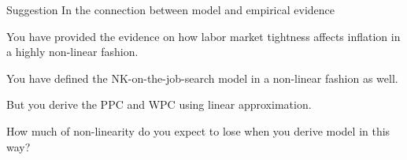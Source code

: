 \documentclass[11pt,aspectratio=169,usenames,dvipsnames]{beamer}
\let\tempone\itemize
\let\temptwo\enditemize
\renewenvironment{itemize}{\tempone\addtolength{\itemsep}{\fill}}{\temptwo}
\begin{document}
\begin{frame}{Suggestion}
\label{slide:Suggestion}
    In the connection between model and empirical evidence
    \begin{itemize}
        \item You have provided the evidence on how labor market tightness affects inflation in a highly non-linear fashion.
        \item You have defined the NK-on-the-job-search model in a non-linear fashion as well.
        \item But you derive the PPC and WPC using linear approximation.
        \item \alert{How much of non-linearity do you expect to lose} when you derive model in this way?
    \end{itemize}


\end{frame}



% 
% 
\end{document}
